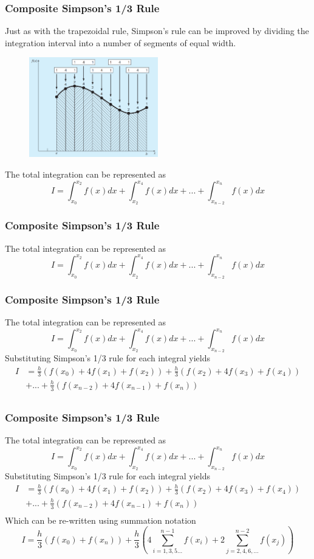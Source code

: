 \documentclass{if-beamer}
\begin{document}
\begin{frame}[t]
	\frametitle{Composite Simpson's 1/3 Rule}
	Just as with the trapezoidal rule, Simpson’s rule can be improved by dividing the integration interval into a number of segments of equal width.
	\begin{figure}
		\centering 
		\includegraphics[width = 0.5\textwidth]{figures/compsimp}
	\end{figure}
    The total integration can be represented as
    $$ I = \int_{x_0}^{x_2}f(x)dx + \int_{x_2}^{x_4}f(x)dx + ... + \int_{x_{n-2}}^{x_n}f(x)dx$$
\end{frame}
\begin{frame}[t]
	\frametitle{Composite Simpson's 1/3 Rule}
	The total integration can be represented as
	$$ I = \int_{x_0}^{x_2}f(x)dx + \int_{x_2}^{x_4}f(x)dx + ... + \int_{x_{n-2}}^{x_n}f(x)dx$$

\end{frame}

\begin{frame}[t]
	\frametitle{Composite Simpson's 1/3 Rule}
	The total integration can be represented as
	$$ I = \int_{x_0}^{x_2}f(x)dx + \int_{x_2}^{x_4}f(x)dx + ... + \int_{x_{n-2}}^{x_n}f(x)dx$$
	Substituting Simpson’s 1/3 rule for each integral yields
	\begin{align*}
		I &= \frac{h}{3}(f(x_0)+4f(x_1)+f(x_2)) + \frac{h}{3}(f(x_2)+4f(x_3)+f(x_4))\\
		&+...+ \frac{h}{3}(f(x_{n-2})+4f(x_{n-1})+f(x_n))\\
	\end{align*}

\end{frame}

\begin{frame}[t]
	\frametitle{Composite Simpson's 1/3 Rule}
	The total integration can be represented as
	$$ I = \int_{x_0}^{x_2}f(x)dx + \int_{x_2}^{x_4}f(x)dx + ... + \int_{x_{n-2}}^{x_n}f(x)dx$$
	Substituting Simpson’s 1/3 rule for each integral yields
	\begin{align*}
		I &= \frac{h}{3}(f(x_0)+4f(x_1)+f(x_2)) + \frac{h}{3}(f(x_2)+4f(x_3)+f(x_4))\\
		&+...+ \frac{h}{3}(f(x_{n-2})+4f(x_{n-1})+f(x_n))\\
	\end{align*}
	Which can be re-written using summation notation
	$$I = \frac{h}{3}(f(x_0)+f(x_n))+\frac{h}{3}\left( 4\sum_{i = 1,3,5...}^{n-1}f(x_i) + 2\sum_{j = 2,4,6,...}^{n-2} f(x_j) \right)$$
\end{frame}
\end{document}
